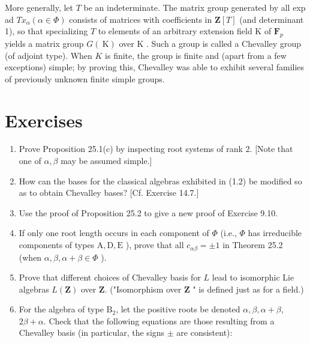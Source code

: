\documentclass[10pt]{article}
\begin{document}
More generally, let $T$ be an indeterminate. The matrix group generated by all exp ad $T x_{\alpha}(\alpha \in \Phi)$ consists of matrices with coefficients in $\mathbf{Z}[T]$ (and determinant 1), so that specializing $T$ to elements of an arbitrary extension field K of $\mathbf{F}_{p}$ yields a matrix group $G(\mathrm{~K})$ over K . Such a group is called a Chevalley group (of adjoint type). When $K$ is finite, the group is finite and (apart from a few exceptions) simple; by proving this, Chevalley was able to exhibit several families of previously unknown finite simple groups.

\section*{Exercises}
\begin{enumerate}
  \item Prove Proposition 25.1(c) by inspecting root systems of rank 2. [Note that one of $\alpha, \beta$ may be assumed simple.]
  \item How can the bases for the classical algebras exhibited in (1.2) be modified so as to obtain Chevalley bases? [Cf. Exercise 14.7.]
  \item Use the proof of Proposition 25.2 to give a new proof of Exercise 9.10.
  \item If only one root length occurs in each component of $\Phi$ (i.e., $\Phi$ has irreducible components of types $\mathrm{A}, \mathrm{D}, \mathrm{E}$ ), prove that all $c_{\alpha \beta}= \pm 1$ in Theorem 25.2 (when $\alpha, \beta, \alpha+\beta \in \Phi$ ).
  \item Prove that different choices of Chevalley basis for $L$ lead to isomorphic Lie algebras $L(\mathbf{Z})$ over $\mathbf{Z}$. ("Isomorphism over $\mathbf{Z}$ " is defined just as for a field.)
  \item For the algebra of type $\mathrm{B}_{2}$, let the positive roots be denoted $\alpha, \beta, \alpha+\beta$, $2 \beta+\alpha$. Check that the following equations are those resulting from a Chevalley basis (in particular, the signs $\pm$ are consistent):
\end{enumerate}
\end{document}
